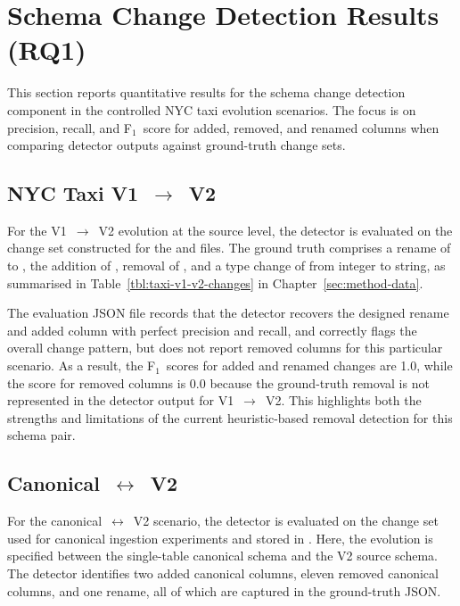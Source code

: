 
\section{Schema Change Detection Results (RQ1)}
\label{sec:results-detection}

This section reports quantitative results for the schema change detection component in the controlled NYC taxi evolution scenarios. The focus is on precision, recall, and F\(_1\)~score for added, removed, and renamed columns when comparing detector outputs against ground-truth change sets.

\subsection{NYC Taxi V1~\texorpdfstring{$\rightarrow$}{->}~V2}

For the V1~$\rightarrow$~V2 evolution at the source level, the detector is evaluated on the change set constructed for the  and  files. The ground truth comprises a rename of  to , the addition of , removal of , and a type change of  from integer to string, as summarised in Table~\ref{tbl:taxi-v1-v2-changes} in Chapter~\ref{sec:method-data}.

The evaluation JSON file  records that the detector recovers the designed rename and added column with perfect precision and recall, and correctly flags the overall change pattern, but does not report removed columns for this particular scenario. As a result, the F\(_1\)~scores for added and renamed changes are 1.0, while the score for removed columns is 0.0 because the ground-truth removal is not represented in the detector output for V1~$\rightarrow$~V2. This highlights both the strengths and limitations of the current heuristic-based removal detection for this schema pair.

\subsection{Canonical~\texorpdfstring{$\leftrightarrow$}{<->}~V2}

For the canonical~$\leftrightarrow$~V2 scenario, the detector is evaluated on the change set used for canonical ingestion experiments and stored in . Here, the evolution is specified between the single-table canonical schema and the V2 source schema. The detector identifies two added canonical columns, eleven removed canonical columns, and one rename, all of which are captured in the ground-truth JSON.


